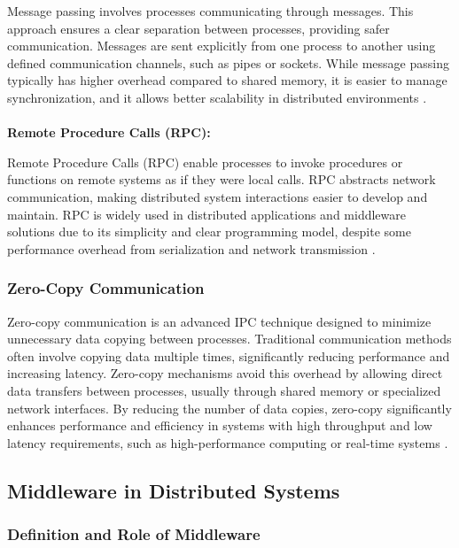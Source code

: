 Message passing involves processes communicating through messages. This approach ensures a clear separation between processes, providing safer communication. Messages are sent explicitly from one process to another using defined communication channels, such as pipes or sockets. While message passing typically has higher overhead compared to shared memory, it is easier to manage synchronization, and it allows better scalability in distributed environments \cite{tanenbaum2015}.
\\
\\
\textbf{Remote Procedure Calls (RPC):}

Remote Procedure Calls (RPC) enable processes to invoke procedures or functions on remote systems as if they were local calls. RPC abstracts network communication, making distributed system interactions easier to develop and maintain. RPC is widely used in distributed applications and middleware solutions due to its simplicity and clear programming model, despite some performance overhead from serialization and network transmission \cite{coulouris2012}.

\subsubsection{Zero-Copy Communication}

Zero-copy communication is an advanced IPC technique designed to minimize unnecessary data copying between processes. Traditional communication methods often involve copying data multiple times, significantly reducing performance and increasing latency. Zero-copy mechanisms avoid this overhead by allowing direct data transfers between processes, usually through shared memory or specialized network interfaces. By reducing the number of data copies, zero-copy significantly enhances performance and efficiency in systems with high throughput and low latency requirements, such as high-performance computing or real-time systems \cite{raiciu2017}.




\subsection{Middleware in Distributed Systems}

\subsubsection{Definition and Role of Middleware}

